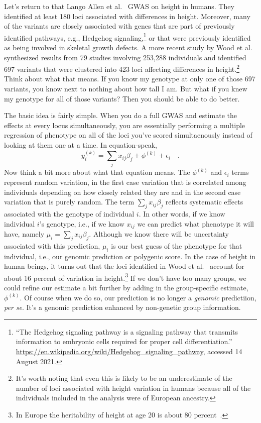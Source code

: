 \documentclass[12pt]{article}
\begin{document}
Let's return to that Lango Allen et al.~\cite{LangoAllen-etal-2010}
GWAS on height in humans. They identified at least 180 loci associated
with differences in height. Moreover, many of the variants are closely
associated with genes that are part of previously identified pathways,
e.g., Hedgehog signaling,\footnote{``The Hedgehog signaling pathway is
  a signaling pathway that transmits information to embryonic cells
  required for proper cell differentiation.''
  \url{https://en.wikipedia.org/wiki/Hedgehog_signaling_pathway},
  accessed 14 August 2021.} or
that were previously identified as being involved in skeletal growth
defects. A more recent study by Wood et al.~\cite{Wood-etal-2014}
synthesized results from 79 studies involving 253,288 individuals and
identified 697 variants that were clustered into 423 loci affecting
differences in height.\footnote{It's worth noting that even this is
  likely to be an underestimate of the number of loci associated with
  height variation in humans because all of the individuals included
  in the analysis were of European ancestry.} Think about what that
means. If you know my genotype at only one of those 697 variants, you
know next to nothing about how tall I am. But what if you knew my
genotype for all of those variants? Then you should be able to do
better.

The basic idea is fairly simple. When you do a full GWAS and estimate
the effects at every locus simultaneously, you are essentially
performing a multiple regression of phenotype on all of the loci
you've scored simultaenously instead of looking at them one at a
time. In equation-speak,
\[
y_i^{(k)} = \sum_j x_{ij}\beta_j + \phi^{(k)} + \epsilon_i \quad .
\]
Now think a bit more about what that equation means. The $\phi^{(k)}$
and $\epsilon_i$ terms represent random variation, in the first case
variation that is correlated among individuals depending on how
closely related they are and in the second case variation that is
purely random. The term $\sum_j x_{ij}\beta_j$ reflects systematic
effects associated with the genotype of individual $i$. In other
words, if we know individual $i$'s genotype, i.e., if we know $x_{ij}$
we can predict what phenotype it will have, namely
$\mu_i = \sum_j x_{ij}\beta_j$. Although we know there will be
uncertainty associated with this prediction, $\mu_i$ is our best guess
of the phenotype for that individual, i.e., our genomic prediction or
polygenic score. In the case of height in human beings, it turns out
that the loci identified in Wood et al.~\cite{Wood-etal-2014} account
for about 16 percent of variation in height.\footnote{In Europe the
  heritability of height at age 20 is about 80
  percent~\cite{Jelenkovic-etal-2016}.}
 If we don't have too many groups, we could
refine our estimate a bit further by adding in the group-specific
estimate, $\phi^{(k)}$. Of course when we do so, our prediction is no
longer a {\it genomic\/} predictiion, {\it per se}. It's a genomic
prediction enhanced by non-genetic group information.
\end{document}
